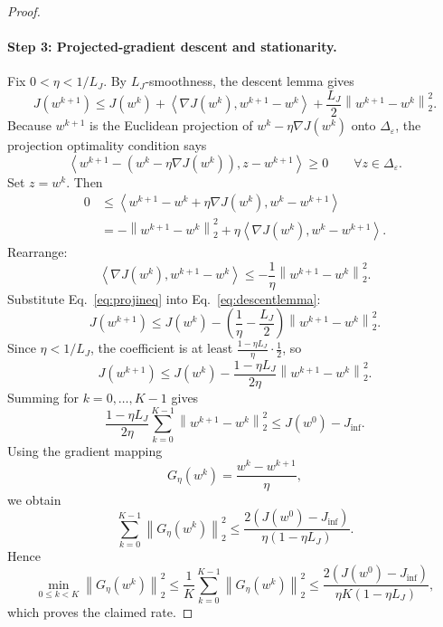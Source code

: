 \documentclass{article}
\newcommand{\simplex}{\Delta}
\newcommand{\norm}[1]{\left\lVert #1 \right\rVert}
\newcommand{\inner}[2]{\left\langle #1, #2 \right\rangle}
\newcommand{\epssimplex}{\simplex_{\varepsilon}}
\begin{document}
\begin{proof}
\paragraph{Step 3: Projected-gradient descent and stationarity.}
Fix \(0<\eta<1/L_J\). By \(L_J\)-smoothness, the descent lemma gives
\begin{equation}
    J(w^{k+1})
    \le
    J(w^k)
    +
    \inner{\nabla J(w^k)}{w^{k+1}-w^k}
    +
    \frac{L_J}{2}\norm{w^{k+1}-w^k}_2^2.
    \label{eq:descentlemma}
\end{equation}
Because \(w^{k+1}\) is the Euclidean projection of \(w^k-\eta \nabla J(w^k)\) onto \(\epssimplex\), the projection optimality condition says
\begin{equation}
    \inner{
        w^{k+1} - (w^k-\eta \nabla J(w^k))
    }{
        z - w^{k+1}
    }
    \ge 0
    \qquad \forall z\in\epssimplex.
\end{equation}
Set \(z=w^k\). Then
\begin{align}
    0
    &\le
    \inner{
        w^{k+1}-w^k+\eta \nabla J(w^k)
    }{
        w^k - w^{k+1}
    } \\
    &=
    -\norm{w^{k+1}-w^k}_2^2
    +
    \eta \inner{\nabla J(w^k)}{w^k-w^{k+1}}.
\end{align}
Rearrange:
\begin{equation}
    \inner{\nabla J(w^k)}{w^{k+1}-w^k}
    \le
    -\frac{1}{\eta}\norm{w^{k+1}-w^k}_2^2.
    \label{eq:projineq}
\end{equation}
Substitute Eq.~\eqref{eq:projineq} into Eq.~\eqref{eq:descentlemma}:
\begin{equation}
    J(w^{k+1})
    \le
    J(w^k)
    -
    \left(\frac{1}{\eta} - \frac{L_J}{2}\right)\norm{w^{k+1}-w^k}_2^2.
\end{equation}
Since \(\eta < 1/L_J\), the coefficient is at least \(\frac{1-\eta L_J}{\eta}\cdot \frac{1}{2}\), so
\begin{equation}
    J(w^{k+1})
    \le
    J(w^k)
    -
    \frac{1-\eta L_J}{2\eta}\norm{w^{k+1}-w^k}_2^2.
\end{equation}
Summing for \(k=0,\dots,K-1\) gives
\begin{equation}
    \frac{1-\eta L_J}{2\eta}\sum_{k=0}^{K-1}\norm{w^{k+1}-w^k}_2^2
    \le
    J(w^0)-J_{\inf}.
\end{equation}
Using the gradient mapping
\begin{equation}
    G_\eta(w^k) = \frac{w^k-w^{k+1}}{\eta},
\end{equation}
we obtain
\begin{equation}
    \sum_{k=0}^{K-1}\norm{G_\eta(w^k)}_2^2
    \le
    \frac{2(J(w^0)-J_{\inf})}{\eta(1-\eta L_J)}.
\end{equation}
Hence
\begin{equation}
    \min_{0\le k < K}\norm{G_\eta(w^k)}_2^2
    \le
    \frac{1}{K}\sum_{k=0}^{K-1}\norm{G_\eta(w^k)}_2^2
    \le
    \frac{2(J(w^0)-J_{\inf})}{\eta K(1-\eta L_J)},
\end{equation}
which proves the claimed rate.


\end{proof}
\end{document}

